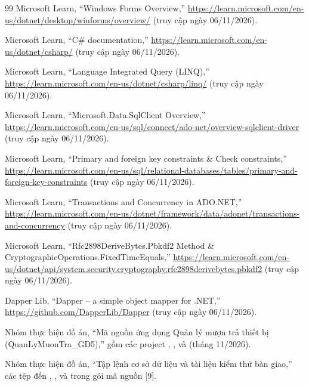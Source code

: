 \begin{thebibliography}{99}
 Microsoft Learn, “Windows Forms Overview,” \url{https://learn.microsoft.com/en-us/dotnet/desktop/winforms/overview/} (truy cập ngày 06/11/2026).

 Microsoft Learn, “C\# documentation,” \url{https://learn.microsoft.com/en-us/dotnet/csharp/} (truy cập ngày 06/11/2026).

 Microsoft Learn, “Language Integrated Query (LINQ),” \url{https://learn.microsoft.com/en-us/dotnet/csharp/linq/} (truy cập ngày 06/11/2026).

 Microsoft Learn, “Microsoft.Data.SqlClient Overview,” \url{https://learn.microsoft.com/en-us/sql/connect/ado-net/overview-sqlclient-driver} (truy cập ngày 06/11/2026).

 Microsoft Learn, “Primary and foreign key constraints \& Check constraints,” \url{https://learn.microsoft.com/en-us/sql/relational-databases/tables/primary-and-foreign-key-constraints} (truy cập ngày 06/11/2026).

 Microsoft Learn, “Transactions and Concurrency in ADO.NET,” \url{https://learn.microsoft.com/en-us/dotnet/framework/data/adonet/transactions-and-concurrency} (truy cập ngày 06/11/2026).

 Microsoft Learn, “Rfc2898DeriveBytes.Pbkdf2 Method \& CryptographicOperations.FixedTimeEquals,” \url{https://learn.microsoft.com/en-us/dotnet/api/system.security.cryptography.rfc2898derivebytes.pbkdf2} (truy cập ngày 06/11/2026).

 Dapper Lib, “Dapper – a simple object mapper for .NET,” \url{https://github.com/DapperLib/Dapper} (truy cập ngày 06/11/2026).

 Nhóm thực hiện đồ án, “Mã nguồn ứng dụng Quản lý mượn trả thiết bị (QuanLyMuonTra\_GD5),” gồm các project , ,  và  (tháng 11/2026).

 Nhóm thực hiện đồ án, “Tập lệnh cơ sở dữ liệu và tài liệu kiểm thử bàn giao,” các tệp  đến , ,  và  trong gói mã nguồn [9].
\end{thebibliography}
